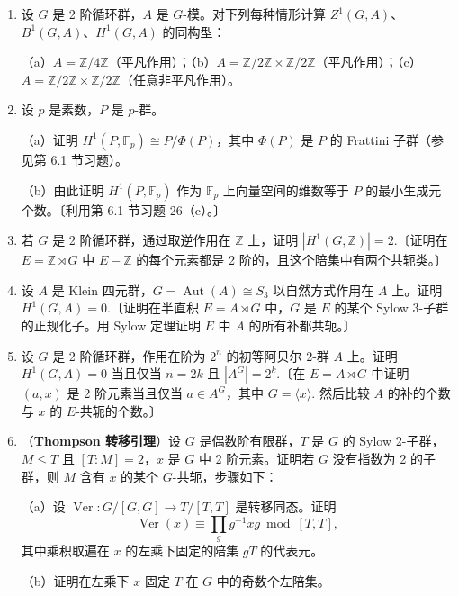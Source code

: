 \begin{enumerate}
\item 设 \(G\) 是 2 阶循环群，\(A\) 是 \(G\)-模。对下列每种情形计算 \(Z^1(G, A)\)、\(B^1(G, A)\)、\(H^1(G, A)\) 的同构型：

（a）\(A = \mathbb{Z}/4\mathbb{Z}\)（平凡作用）；（b）\(A = \mathbb{Z}/2\mathbb{Z} \times \mathbb{Z}/2\mathbb{Z}\)（平凡作用）；（c）\(A = \mathbb{Z}/2\mathbb{Z} \times \mathbb{Z}/2\mathbb{Z}\)（任意非平凡作用）。

\item 设 \(p\) 是素数，\(P\) 是 \(p\)-群。

（a）证明 \(H^1(P, \mathbb{F}_p) \cong P/\Phi(P)\)，其中 \(\Phi(P)\) 是 \(P\) 的 Frattini 子群（参见第 6.1 节习题）。

（b）由此证明 \(H^1(P, \mathbb{F}_p)\) 作为 \(\mathbb{F}_p\) 上向量空间的维数等于 \(P\) 的最小生成元个数。〔利用第 6.1 节习题 26（c）。〕

\item 若 \(G\) 是 2 阶循环群，通过取逆作用在 \(\mathbb{Z}\) 上，证明 \(|H^1(G, \mathbb{Z})| = 2\).〔证明在 \(E = \mathbb{Z} \rtimes G\) 中 \(E-\mathbb{Z}\) 的每个元素都是 2 阶的，且这个陪集中有两个共轭类。〕

\item 设 \(A\) 是 Klein 四元群，\(G = \operatorname{Aut}(A) \cong S_3\) 以自然方式作用在 \(A\) 上。证明 \(H^1(G, A) = 0\).〔证明在半直积 \(E = A \rtimes G\) 中，\(G\) 是 \(E\) 的某个 Sylow 3-子群的正规化子。用 Sylow 定理证明 \(E\) 中 \(A\) 的所有补都共轭。〕

\item 设 \(G\) 是 2 阶循环群，作用在阶为 \(2^n\) 的初等阿贝尔 2-群 \(A\) 上。证明 \(H^1(G, A) = 0\) 当且仅当 \(n = 2k\) 且 \(|A^G| = 2^k\).〔在 \(E = A \rtimes G\) 中证明 \((a, x)\) 是 2 阶元素当且仅当 \(a \in A^G\)，其中 \(G = \langle x\rangle\). 然后比较 \(A\) 的补的个数与 \(x\) 的 \(E\)-共轭的个数。〕

\item （\textbf{Thompson 转移引理}）设 \(G\) 是偶数阶有限群，\(T\) 是 \(G\) 的 Sylow 2-子群，\(M \leq T\) 且 \([T:M] = 2\)，\(x\) 是 \(G\) 中 2 阶元素。证明若 \(G\) 没有指数为 2 的子群，则 \(M\) 含有 \(x\) 的某个 \(G\)-共轭，步骤如下：

（a）设 \(\operatorname{Ver} : G/[G,G] \to T/[T,T]\) 是转移同态。证明
\[
\operatorname{Ver}(x) \equiv \prod_g g^{-1}xg \bmod [T,T],
\]
其中乘积取遍在 \(x\) 的左乘下固定的陪集 \(gT\) 的代表元。

（b）证明在左乘下 \(x\) 固定 \(T\) 在 \(G\) 中的奇数个左陪集。


\end{enumerate}
